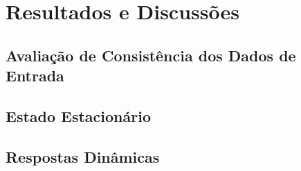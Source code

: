 %
% 
%
\chapter{Resultados e Discussões} \label{chap:resultados}

\section{Avaliação de Consistência dos Dados de Entrada}



\section{Estado Estacionário} \label{sec:estadoestacionario}

\section{Respostas Dinâmicas} \label{sec:respostasdinamicas}